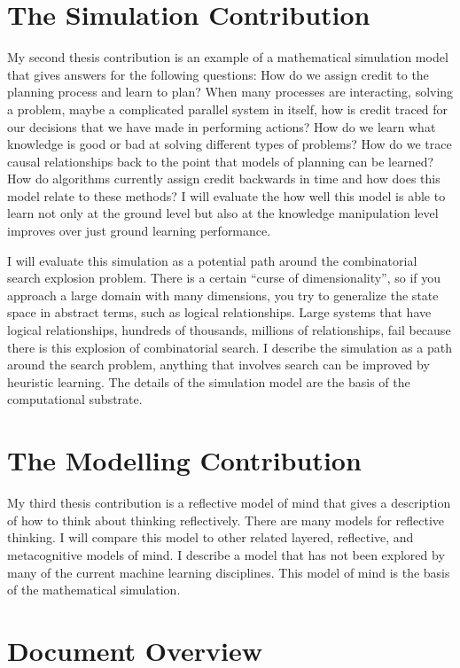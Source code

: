 \section{The Simulation Contribution}

My second thesis contribution is an example of a mathematical
simulation model that gives answers for the following questions: How
do we assign credit to the planning process and learn to plan?  When
many processes are interacting, solving a problem, maybe a complicated
parallel system in itself, how is credit traced for our decisions that
we have made in performing actions?  How do we learn what knowledge is
good or bad at solving different types of problems?  How do we trace
causal relationships back to the point that models of planning can be
learned?  How do algorithms currently assign credit backwards in time
and how does this model relate to these methods?  I will evaluate the
how well this model is able to learn not only at the ground level but
also at the knowledge manipulation level improves over just ground
learning performance.

I will evaluate this simulation as a potential path around the
combinatorial search explosion problem.  There is a certain ``curse of
dimensionality'', so if you approach a large domain with many
dimensions, you try to generalize the state space in abstract terms,
such as logical relationships.  Large systems that have logical
relationships, hundreds of thousands, millions of relationships, fail
because there is this explosion of combinatorial search.  I describe
the simulation as a path around the search problem, anything that
involves search can be improved by heuristic learning.  The details of
the simulation model are the basis of the computational substrate.

\section{The Modelling Contribution}

My third thesis contribution is a reflective model of mind that gives
a description of how to think about thinking reflectively.  There are
many models for reflective thinking.  I will compare this model to
other related layered, reflective, and metacognitive models of mind.
I describe a model that has not been explored by many of the current
machine learning disciplines.  This model of mind is the basis of the
mathematical simulation.

\section{Document Overview}

